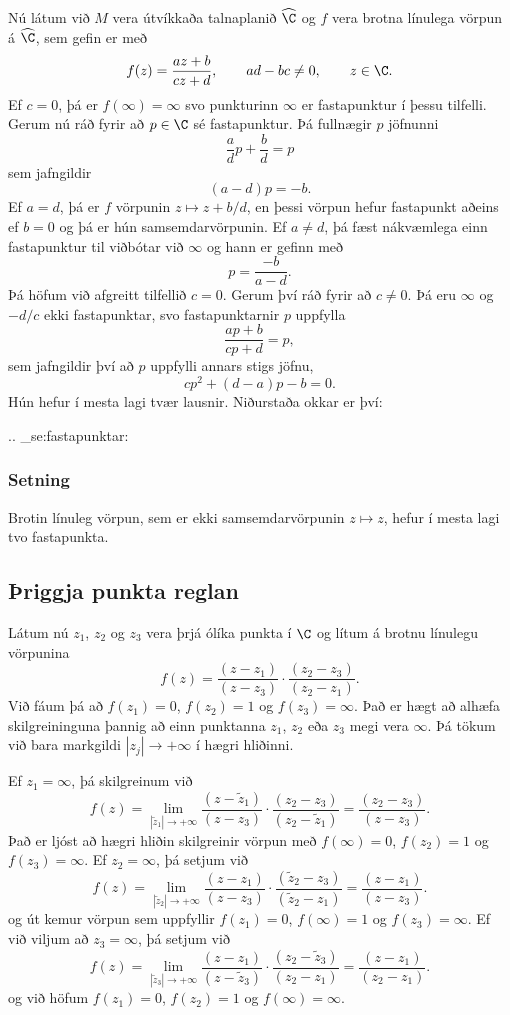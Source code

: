 Nú látum við $M$ vera útvíkkaða talnaplanið $\widehat \C$ og $f$ vera
brotna línulega vörpun á $\widehat \C$, sem gefin er með
$$
f(z)=\dfrac{az+b}{cz+d}, \qquad ad-bc\neq 0, \qquad z\in \C.
$$
Ef $c=0$, þá er $f(\infty)=\infty$ svo punkturinn $\infty$ er
fastapunktur í þessu tilfelli.  Gerum nú ráð fyrir að $p\in \C$ sé
fastapunktur. Þá fullnægir $p$ jöfnunni
$$
\dfrac ad p+\dfrac bd=p 
$$
sem jafngildir 
$$
(a-d)p=-b.
$$
Ef $a=d$, þá er $f$ vörpunin $z\mapsto z+b/d$, en þessi vörpun hefur
fastapunkt aðeins ef $b=0$ og  þá er hún samsemdarvörpunin.
Ef $a\neq d$, þá fæst nákvæmlega einn fastapunktur til viðbótar við
$\infty$ og hann er gefinn með
$$
p=\dfrac {-b}{a-d}.
$$
Þá höfum við afgreitt tilfellið $c=0$.  Gerum því ráð fyrir að $c\neq
0$.  Þá eru $\infty$ og $-d/c$ ekki fastapunktar, svo fastapunktarnir
$p$ uppfylla 
$$
\dfrac{ap+b}{cp+d}=p,
$$
sem jafngildir því að $p$ uppfylli annars stigs jöfnu,
$$
cp^2+(d-a)p-b=0.
$$
Hún hefur í mesta lagi tvær lausnir.  Niðurstaða okkar er því:


.. _se:fastapunktar:

\subsubsection{Setning}
Brotin línuleg vörpun, sem er ekki samsemdarvörpunin $z\mapsto z$,
hefur í mesta lagi tvo fastapunkta. 


\subsection*{Þriggja punkta reglan}

Látum nú $z_1$, $z_2$ og $z_3$ vera þrjá ólíka punkta í $\C$ og lítum
á brotnu línulegu vörpunina
$$
f(z)=\dfrac{(z-z_1)}{(z-z_3)}\cdot \dfrac{(z_2-z_3)}{(z_2-z_1)}.
$$
Við fáum þá að $f(z_1)=0$, $f(z_2)=1$ og $f(z_3)=\infty$.   Það er
hægt að alhæfa skilgreininguna þannig að einn punktanna $z_1$, $z_2$
eða $z_3$ megi vera $\infty$.  Þá tökum við bara markgildi $|z_j|\to
+\infty$ í hægri hliðinni.    

Ef $z_1=\infty$, þá skilgreinum við
$$
f(z)=\lim_{|\tilde z_1|\to+\infty}
\dfrac{(z-\tilde z_1)}{(z-z_3)}\cdot \dfrac{(z_2-z_3)}{(z_2-\tilde
z_1)}
=\dfrac {(z_2-z_3)}{(z-z_3)}.
$$
Það er ljóst að hægri hliðin skilgreinir vörpun með
$f(\infty)=0$, $f(z_2)=1$ og $f(z_3)=\infty$.
Ef $z_2=\infty$, þá setjum við 
$$
f(z)=\lim_{|\tilde z_2|\to+\infty}
\dfrac{(z-z_1)}{(z-z_3)}\cdot \dfrac{(\tilde z_2-z_3)}{(\tilde z_2-
z_1)}
=\dfrac {(z-z_1)}{(z-z_3)}.
$$
og út kemur vörpun sem uppfyllir $f(z_1)=0$, $f(\infty)=1$ og
$f(z_3)=\infty$.  Ef við viljum að $z_3=\infty$, þá setjum við
$$
f(z)=\lim_{|\tilde z_3|\to+\infty}
\dfrac{(z-z_1)}{(z-\tilde z_3)}\cdot \dfrac{( z_2-\tilde z_3)}{(z_2-
z_1)}
=\dfrac {(z-z_1)}{(z_2-z_1)}.
$$
og við höfum $f(z_1)=0$, $f(z_2)=1$ og $f(\infty)=\infty$.


